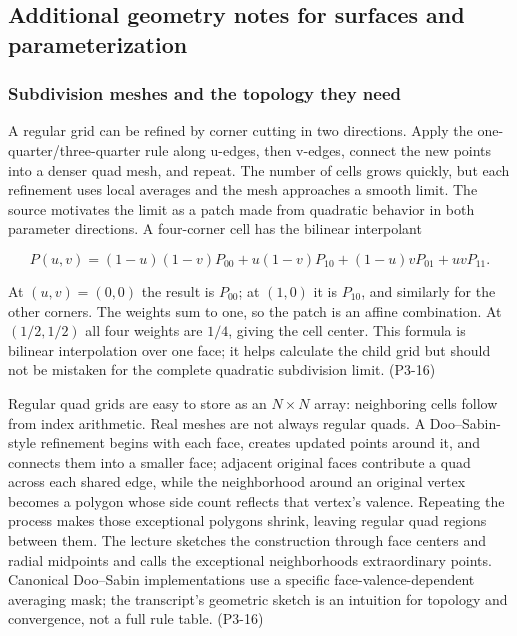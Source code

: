 \subsection{Additional geometry notes for surfaces and parameterization}\label{03-visual-computing-i-ch002-additional-geometry-notes-for-surfaces-and-parameterization}

\subsubsection{Subdivision meshes and the topology they need}\label{03-visual-computing-i-ch002-subdivision-meshes-and-the-topology-they-need}

A regular grid can be refined by corner cutting in two directions. Apply the one-quarter/three-quarter rule along u-edges, then v-edges, connect the new points into a denser quad mesh, and repeat. The number of cells grows quickly, but each refinement uses local averages and the mesh approaches a smooth limit. The source motivates the limit as a patch made from quadratic behavior in both parameter directions. A four-corner cell has the bilinear interpolant

\[
P(u,v)=(1-u)(1-v)P_{00}+u(1-v)P_{10}+(1-u)vP_{01}+uvP_{11}.
\]

At \((u,v)=(0,0)\) the result is \(P_{00}\); at \((1,0)\) it is \(P_{10}\), and similarly for the other corners. The weights sum to one, so the patch is an affine combination. At \((1/2,1/2)\) all four weights are \(1/4\), giving the cell center. This formula is bilinear interpolation over one face; it helps calculate the child grid but should not be mistaken for the complete quadratic subdivision limit. (P3-16)

Regular quad grids are easy to store as an \(N\times N\) array: neighboring cells follow from index arithmetic. Real meshes are not always regular quads. A Doo--Sabin-style refinement begins with each face, creates updated points around it, and connects them into a smaller face; adjacent original faces contribute a quad across each shared edge, while the neighborhood around an original vertex becomes a polygon whose side count reflects that vertex's valence. Repeating the process makes those exceptional polygons shrink, leaving regular quad regions between them. The lecture sketches the construction through face centers and radial midpoints and calls the exceptional neighborhoods extraordinary points. Canonical Doo--Sabin implementations use a specific face-valence-dependent averaging mask; the transcript's geometric sketch is an intuition for topology and convergence, not a full rule table. (P3-16)


